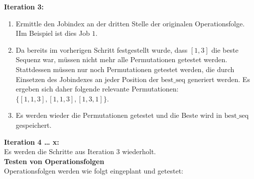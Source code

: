 \documentclass[final, english, ngerman, a4paper, 12pt, %
numbers=noenddot,
cd=true,
cdfont=false,cdfont=nohead,cdfont=nodin,
cdmath=false,
cdhead=false,
cdfoot=true,
cdcover=monochrome,
cdgeometry=symmetric,
declaration=heading,
declaration=notoc,
abstract=heading,
]{tudscrreprt}
\begin{document}
\noindent
\textbf{Iteration 3:}

\begin{enumerate}
	\item Ermittle den Jobindex an der dritten Stelle der originalen Operationsfolge. IIm Beispiel ist dies Job $1$.
	\item Da bereits im vorherigen Schritt festgestellt wurde, dass $[1,3]$ die beste Sequenz war, müssen nicht mehr alle Permutationen getestet werden. Stattdessen müssen nur noch Permutationen getestet werden, die durch Einsetzen des Jobindexes an jeder Position der $\text{best\_seq}$ generiert werden. Es ergeben sich daher folgende relevante Permutationen: $\{ [1,1,3], [1,1,3], [1,3,1] \}$.
	\item Es werden wieder die Permutationen getestet und die Beste wird in $\text{best\_seq}$ gespeichert.
\end{enumerate}

\noindent
\textbf{Iteration 4 … x:}\\
\noindent
Es werden die Schritte aus Iteration 3 wiederholt. \\

\noindent
\textbf{Testen von Operationsfolgen}\\
\noindent
Operationsfolgen werden wie folgt eingeplant und getestet:
\end{document}
